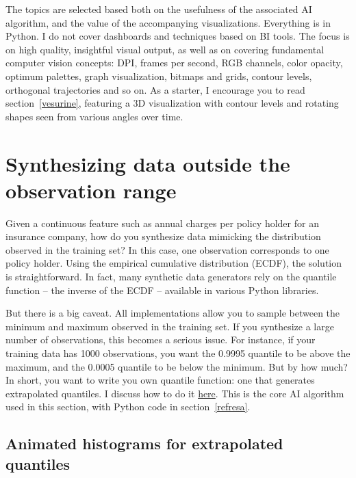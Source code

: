 \documentclass[oneside,10pt]{book}
\begin{document}
\noindent The topics are selected based both on the usefulness of the associated AI algorithm, and the value of the 
accompanying visualizations. Everything is in Python. I do not cover dashboards and techniques based on BI tools. 
 The focus is on high quality, insightful visual output, as well as on covering fundamental computer vision concepts:
 DPI, frames per second, RGB channels, color opacity, optimum palettes, graph visualization, bitmaps and grids, contour
 levels, orthogonal trajectories and so on. As a starter, I encourage you to read section~\ref{vesurine}, featuring a 3D visualization 
 with contour levels and rotating shapes seen from various angles over time.

\section{Synthesizing data outside the observation range}

Given a continuous feature such as annual charges per policy holder for an insurance company, how do you synthesize data mimicking the
 distribution observed in the training set? In this case, one observation corresponds to one policy holder. Using the 
 \textcolor{index}{empirical cumulative distribution}
 (ECDF), the solution is straightforward.  In fact, many \textcolor{index}{synthetic data} generators rely on
  the \textcolor{index}{quantile function} -- the inverse of the ECDF -- available in various Python libraries. 

But there is a big caveat. All implementations allow you to sample between the minimum and maximum observed in the training set.
 If you synthesize a large number of observations, this becomes a serious issue. For instance, if your training data
 has 1000 observations, you want the 0.9995 quantile to be above the maximum, and the 0.0005 quantile to be below the minimum. But by how much? 
 In short, you want to write you own quantile function: one that generates 
 \textcolor{index}{extrapolated quantiles}. I discuss how to do it 
 \href{https://mltblog.com/3QUj6qP}{here}. This is the core AI algorithm used in this section, with Python code
 in section~\ref{refresa}. 


\subsection{Animated histograms for extrapolated quantiles}\label{quantcare}
\end{document}
